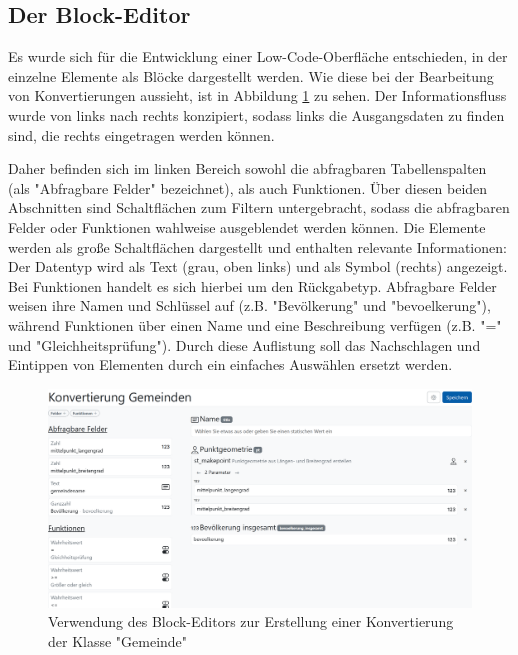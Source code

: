 \subsection{Der Block-Editor}

Es wurde sich für die Entwicklung einer Low-Code-Oberfläche entschieden, in der einzelne Elemente als Blöcke dargestellt werden. Wie diese bei der Bearbeitung von Konvertierungen aussieht, ist in Abbildung \ref{fig:buffet-simple} zu sehen. Der Informationsfluss wurde von links nach rechts konzipiert, sodass links die Ausgangsdaten zu finden sind, die rechts eingetragen werden können.

Daher befinden sich im linken Bereich sowohl die abfragbaren Tabellenspalten (als "Abfragbare Felder" bezeichnet), als auch Funktionen. Über diesen beiden Abschnitten sind Schaltflächen zum Filtern untergebracht, sodass die abfragbaren Felder oder Funktionen wahlweise ausgeblendet werden können. Die Elemente werden als große Schaltflächen dargestellt und enthalten relevante Informationen: Der Datentyp wird als Text (grau, oben links) und als Symbol (rechts) angezeigt. Bei Funktionen handelt es sich hierbei um den Rückgabetyp. Abfragbare Felder weisen ihre Namen und Schlüssel auf (z.B. "Bevölkerung" und "bevoelkerung"), während Funktionen über einen Name und eine Beschreibung verfügen (z.B. "=" und "Gleichheitsprüfung"). Durch diese Auflistung soll das Nachschlagen und Eintippen von Elementen durch ein einfaches Auswählen ersetzt werden.

\begin{figure}[ht]
  \centering
  \includegraphics[width=.95\textwidth]{assets/buffet-simple.png}
  \caption{Verwendung des Block-Editors zur Erstellung einer Konvertierung der Klasse "Gemeinde"}
  \label{fig:buffet-simple}
\end{figure}

